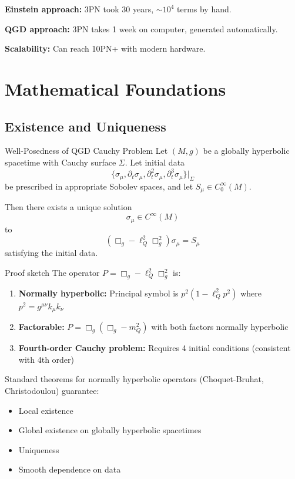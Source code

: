 \documentclass[11pt,a4paper]{article}
\theoremstyle{definition}
\theoremstyle{remark}
\begin{document}
		\textbf{Einstein approach:} 3PN took 30 years, $\sim 10^4$ terms by hand.
		
		\textbf{QGD approach:} 3PN takes 1 week on computer, generated automatically.
		
		\textbf{Scalability:} Can reach 10PN+ with modern hardware.
		
		\section{Mathematical Foundations}
		
		\subsection{Existence and Uniqueness}
		
		Well-Posedness of QGD Cauchy Problem
			Let $(M,g)$ be a globally hyperbolic spacetime with Cauchy surface $\Sigma$. Let initial data
			\begin{equation}
				\{\sigma_\mu, \partial_t\sigma_\mu, \partial_t^2\sigma_\mu, \partial_t^3\sigma_\mu\}|_\Sigma
			\end{equation}
			be prescribed in appropriate Sobolev spaces, and let $S_\mu \in C_0^\infty(M)$.
			
			Then there exists a unique solution
			\begin{equation}
				\sigma_\mu \in C^\infty(M)
			\end{equation}
			to
			\begin{equation}
				(\Box_g - \ell_Q^2\Box_g^2)\sigma_\mu = S_\mu
			\end{equation}
			satisfying the initial data.
		
		Proof sketch
			The operator $P = \Box_g - \ell_Q^2\Box_g^2$ is:
			\begin{enumerate}
				\item \textbf{Normally hyperbolic:} Principal symbol is $p^2(1 - \ell_Q^2 p^2)$ where $p^2 = g^{\mu\nu}k_\mu k_\nu$
				\item \textbf{Factorable:} $P = \Box_g(\Box_g - m_Q^2)$ with both factors normally hyperbolic
				\item \textbf{Fourth-order Cauchy problem:} Requires 4 initial conditions (consistent with 4th order)
			\end{enumerate}
			
			Standard theorems for normally hyperbolic operators (Choquet-Bruhat, Christodoulou) guarantee:
			\begin{itemize}
				\item Local existence
				\item Global existence on globally hyperbolic spacetimes
				\item Uniqueness
				\item Smooth dependence on data
			\end{itemize}
		
\end{document}
